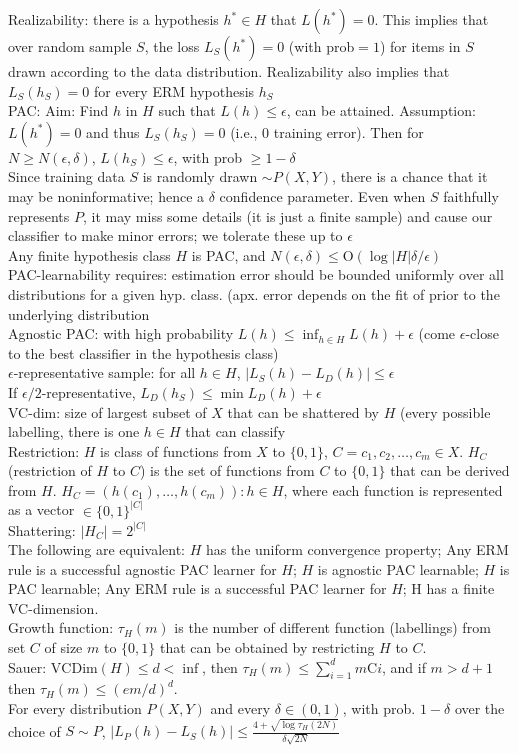 Realizability: there is a hypothesis $h^* \in H$ that $L(h^*) = 0$. This implies that over random sample $S$, the loss $L_S(h^*)=0$
(with prob$=1$) for items in $S$ drawn according to the data distribution. Realizability also implies that $L_S(h_S)=0$ for every ERM hypothesis $h_S$\\
PAC: Aim: Find $h$ in $H$ such that $L(h) \leq \epsilon$, can be attained. Assumption: $L(h^*)=0$ and thus $L_S(h_S)=0$ (i.e., 0 training error). Then for $N \geq N(\epsilon, \delta)$, $L(h_S) \leq \epsilon$, with prob $\geq 1-\delta$\\
Since training data $S$ is randomly drawn $\sim P(X,Y)$, there is a chance that it may be noninformative; hence a $\delta$ confidence parameter. Even when $S$ faithfully represents $P$, it may miss some details (it is just a finite sample) and cause our classifier to make minor errors; we tolerate these up to $\epsilon$\\
Any finite hypothesis class $H$ is PAC, and $N(\epsilon, \delta) \leq \text{O}(\log|H|\delta/\epsilon)$\\
PAC-learnability requires: estimation error should be bounded uniformly over all distributions for a given hyp. class. (apx. error depends on the fit of prior to the underlying distribution\\
Agnostic PAC: with high probability $L(h) \leq \inf_{h \in H} L(h) + \epsilon$ (come $\epsilon$-close to the best classifier in the hypothesis class)\\
$\epsilon$-representative sample: for all $h \in H$, $|L_S(h) - L_D(h)| \leq \epsilon$\\
If $\epsilon / 2$-representative, $L_D(h_S) \leq \min L_D(h) + \epsilon$\\
VC-dim: size of largest subset of $X$ that can be shattered by $H$ (every possible labelling, there is one $h \in H$ that can classify\\
Restriction: $H$ is class of functions from $X$ to $\{0, 1\}$, $C={c_1, c_2, \dots, c_m} \in X$. $H_C$ (restriction of $H$ to $C$) is the set of functions from $C$ to $\{0, 1\}$ that can be derived from $H$. $H_C = {(h(c_1), \dots, h(c_m)): h\in H}$, where each function is represented as a vector $\in \{0, 1\}^{|C|}$\\
Shattering: $|H_C| = 2^{|C|}$\\
The following are equivalent: $H$ has the uniform convergence property; Any ERM rule is a successful agnostic PAC learner for $H$; $H$ is agnostic PAC learnable; $H$ is PAC learnable; Any ERM rule is a successful PAC learner for $H$; H has a finite VC-dimension.\\
Growth function: $\tau_H(m)$ is the number of different function (labellings) from set $C$ of size $m$ to $\{0, 1\}$ that can be obtained by restricting $H$ to $C$.\\
Sauer: $\text{VCDim}(H) \leq d < \inf$, then $\tau_H(m) \leq \sum_{i=1}^d m\text{C}i$, and if $m > d + 1$ then $\tau_H(m) \leq (em/d)^d$.\\
For every distribution $P(X, Y)$ and every $\delta \in (0, 1)$, with prob. $1 - \delta$ over the choice of $S \sim P$, $|L_P(h) - L_S(h)| \leq \frac{4 + \sqrt{\log \tau_H(2N)}}{\delta \sqrt{2N}}$

